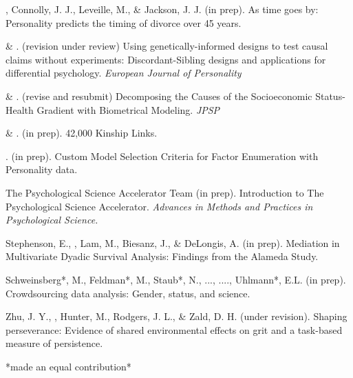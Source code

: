 
\item\meb, Connolly, J. J., Leveille, M., \& Jackson, J. J. (in prep). As time goes by: Personality predicts the timing of divorce over 45 years.%
\item \meb \& \joe. (revision under review) Using genetically-informed designs to test causal claims without experiments: Discordant-Sibling designs and applications for differential psychology. \textit{European Journal of Personality}  \href{https://osf.io/zpdwt/}{\color{blue}{https://osf.io/zpdwt/}}
\item \meb \& \joe.  (revise and resubmit) Decomposing the Causes of the Socioeconomic Status-Health Gradient with Biometrical Modeling.  \textit{JPSP} \href{https://osf.io/vd2kc/}{\color{blue}{https://osf.io/vd2kc/}}
\item \meb \& \joe.  (in prep). 42,000 Kinship Links.
\item \meb. (in prep). Custom Model Selection Criteria for Factor Enumeration with Personality data.
\item The Psychological Science Accelerator Team (in prep). Introduction to The Psychological Science Accelerator. \textit{Advances in Methods and Practices in Psychological Science.}
\item Stephenson, E., \meb, Lam, M., Biesanz, J., \& DeLongis, A. (in prep). Mediation in Multivariate Dyadic Survival Analysis: Findings from the Alameda Study. %
\item Schweinsberg*, M., Feldman*, M., Staub*, N., ..., \meb ...., Uhlmann*, E.L. (in prep). Crowdsourcing data analysis: Gender, status, and science. 
\item Zhu, J. Y., \meb, Hunter, M., Rodgers, J. L., \& Zald, D. H. (under revision). Shaping perseverance: Evidence of shared environmental effects on grit and a task-based measure of persistence. %
\vspace{-2mm}\begin{center}\footnotesize{*made an equal contribution*}\end{center} \vspace{-3mm}
\vspace{-2mm}\begin{center}\end{center} \vspace{-4mm}
